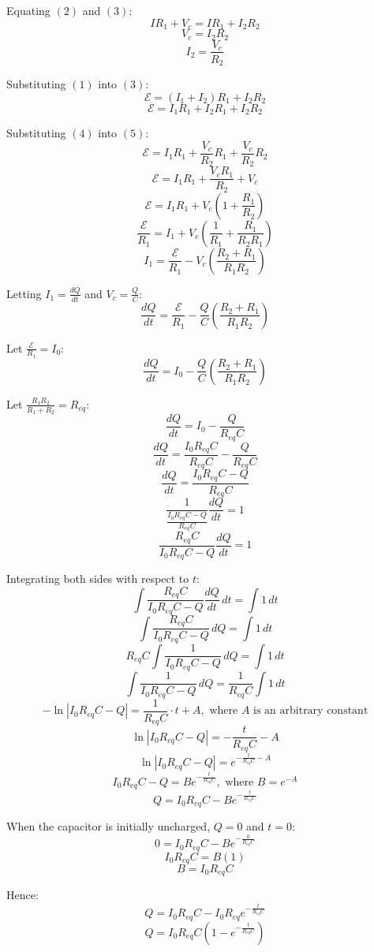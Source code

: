 \documentclass[11pt]{article}
\begin{document}
Equating \((2)\) and \((3)\):
\[IR_1 + V_c = IR_1 + I_2 R_2\]
\[V_c = I_2 R_2\]
\[I_2 = \frac{V_c}{R_2} \tag{4}\]

Substituting \((1)\) into \((3)\):
\[\mathcal{E} = (I_1 + I_2) R_1 + I_2R_2\]
\[\mathcal{E} = I_1 R_1 + I_2 R_1 + I_2R_2 \tag{5}\]

Substituting \((4)\) into \((5)\):
\[\mathcal{E} = I_1 R_1 + \frac{V_c}{R_2} R_1 + \frac{V_c}{R_2} R_2\]
\[\mathcal{E} = I_1 R_1 + \frac{V_c R_1}{R_2} + V_c\]
\[\mathcal{E} = I_1 R_1 + V_c \left( 1 + \frac{R_1}{R_2}\right)\]
\[\frac{\mathcal{E}}{R_1} = I_1 + V_c \left( \frac{1}{R_1} + \frac{R_1}{R_2R_1}\right)\]
\[I_1 = \frac{\mathcal{E}}{R_1} - V_c \left( \frac{R_2 + R_1}{R_1R_2}\right) \]

\newpage

Letting \(I_1 = \frac{dQ}{dt}\) and \(V_c = \frac{Q}{C}\):
\[\frac{dQ}{dt} = \frac{\mathcal{E}}{R_1} - \frac{Q}{C} \left( \frac{R_2 + R_1}{R_1 R_2} \right)\]

Let \(\frac{\mathcal{E}}{R_1} = I_0\):
\[\frac{dQ}{dt} = I_0 - \frac{Q}{C} \left( \frac{R_2 + R_1}{R_1 R_2} \right)\]

Let \(\frac{R_1 R_2}{R_1 + R_2} = R_{eq}\):
\[\frac{dQ}{dt} = I_0 - \frac{Q}{R_{eq}C}\]
\[\frac{dQ}{dt} = \frac{I_0 R_{eq}C}{R_{eq}C} - \frac{Q}{R_{eq}C}\]
\[\frac{dQ}{dt} = \frac{I_0 R_{eq}C - Q}{R_{eq}C}\]
\[\frac{1}{\frac{I_0 R_{eq}C - Q}{R_{eq}C}} \frac{dQ}{dt} = 1\]
\[\frac{R_{eq}C}{I_0 R_{eq}C - Q} \frac{dQ}{dt} = 1\]

Integrating both sides with respect to \(t\):
\[\int \frac{R_{eq}C}{I_0 R_{eq}C - Q} \frac{dQ}{dt} \, dt = \int 1 \, dt\]
\[\int \frac{R_{eq}C}{I_0 R_{eq}C - Q} \, dQ = \int 1 \, dt\]
\[R_{eq} C \int \frac{1}{I_0 R_{eq}C - Q} \, dQ = \int 1 \, dt\]
\[\int \frac{1}{I_0 R_{eq}C - Q} \, dQ = \frac{1}{R_{eq} C} \int 1 \, dt\]
\[- \ln |I_0 R_{eq} C - Q| = \frac{1}{R_{eq} C} \cdot t + A, \text{ where } A \text{ is an arbitrary constant}\]
\[\ln |I_0 R_{eq} C - Q| = - \frac{t}{R_{eq} C} - A\]
\[\ln |I_0 R_{eq} C - Q| = e^{- \frac{t}{R_{eq} C} - A}\]
\[I_0 R_{eq} C - Q = Be^{- \frac{t}{R_{eq} C}}, \text{ where } B = e^{-A}\]
\[Q = I_0 R_{eq} C - Be^{- \frac{t}{R_{eq} C}}\]

\newpage

When the capacitor is initially uncharged, \(Q = 0\) and \(t = 0\):
\[0 = I_0 R_{eq} C - Be^{- \frac{0}{R_{eq} C}}\]
\[I_0 R_{eq} C = B(1)\]
\[B = I_0 R_{eq} C\]

Hence:
\[Q = I_0 R_{eq} C - I_0 R_{eq} e^{- \frac{t}{R_{eq} C}}\]
\[Q = I_0 R_{eq} C \left(1 - e^{- \frac{t}{R_{eq} C}} \right)\]
\end{document}

